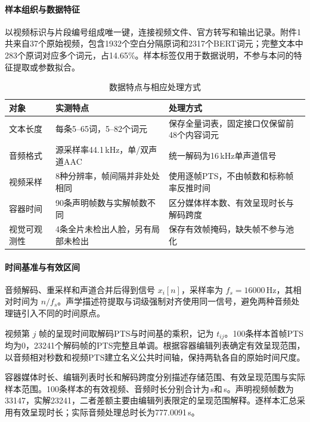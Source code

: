 \paragraph{样本组织与数据特征}

以视频标识与片段编号组成唯一键，连接视频文件、官方转写和输出记录。附件1共来自37个原始视频，包含1932个空白分隔原词和2317个BERT词元；完整文本中283个原词对应多个词元，占14.65\%。样本标签仅用于数据说明，不参与本问的特征提取或参数拟合。

\begin{table}[htbp]
\centering\small
\caption{数据特点与相应处理方式}
\label{q1:tab:data}
\begin{tabularx}{\linewidth}{p{3.1cm}p{4.0cm}Y}
\toprule
对象 & 实测特点 & 处理方式 \\
\midrule
文本长度 & 每条5--65词，5--82个词元 & 保存全量词表，固定接口仅保留前48个内容词元 \\
音频格式 & 源采样率44.1\,kHz，单/双声道AAC & 统一解码为16\,kHz单声道信号 \\
视频采样 & 8种分辨率，帧间隔并非处处相同 & 使用逐帧PTS，不由帧数和标称帧率反推时间 \\
容器时间 & 90条声明帧数与实解帧数不同 & 区分媒体样本数、有效呈现时长与解码跨度 \\
视觉可观测性 & 4条全片未检出人脸，另有局部未检出 & 保存有效帧掩码，缺失帧不参与池化 \\
\bottomrule
\end{tabularx}
\end{table}

\paragraph{时间基准与有效区间}

音频解码、重采样和声道合并后得到信号 $x_i[n]$，采样率为 $f_s=16000$\,Hz，其相对时间为 $n/f_s$。声学描述符提取与词级强制对齐使用同一信号，避免两种音频处理链引入不同的时间原点。

视频第 $j$ 帧的呈现时间取解码PTS与时间基的乘积，记为 $t_{ij}$。100条样本首帧PTS均为0，23241个解码帧的PTS完整且单调。根据容器编辑列表确定有效呈现范围，以音频相对秒数和视频PTS建立名义公共时间轴，保持两轨各自的原始时间尺度。

容器媒体时长、编辑列表时长和解码跨度分别描述存储范围、有效呈现范围与实际样本范围。100条样本的有效视频、音频时长分别合计为\VideoDuration\,s和\AudioDuration\,s。声明视频帧数为33147，实解23241，二者差额主要由编辑列表限定的呈现范围解释。逐样本汇总采用有效呈现时长；实际音频处理总时长为777.0091\,s。

